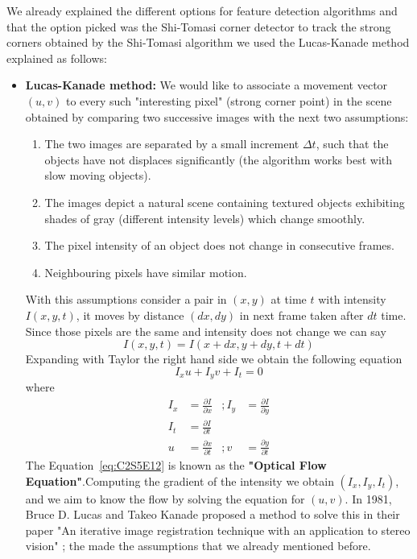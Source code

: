 We already explained the different options for feature detection algorithms and that the option picked was the Shi-Tomasi corner detector to track the strong corners obtained by the Shi-Tomasi algorithm we used the Lucas-Kanade method explained as follows:
\begin{itemize}
\item \textbf{Lucas-Kanade method:} We would like to associate a movement vector $(u,v)$ to every such "interesting pixel" (strong corner point) in the scene obtained by comparing two successive images with the next two assumptions:
\begin{enumerate}
\item The two images are separated by a small increment $\Delta t$, such that the objects have not displaces significantly (the algorithm works best with slow moving objects). 
\item The images depict a natural scene containing textured objects exhibiting shades of gray (different intensity levels) which change smoothly.
\item The pixel intensity of an object does not change in consecutive frames.
\item Neighbouring pixels have similar motion.
\end{enumerate}
With this assumptions consider a pair in $(x,y)$ at time $t$ with intensity $I(x,y,t)$, it moves by distance $(dx,dy)$ in next frame taken after $dt$ time. Since those pixels are the same and intensity does not change we can say 
$$
I(x,y,t)=I(x+dx,y+dy,t+dt)
$$
Expanding with Taylor the right hand side we obtain the following equation
\begin{equation}
\label{eq:C2S5E12}
I_xu+I_yv+I_t=0
\end{equation}
where 
$$
\begin{aligned}
I_x &= \frac{\partial I}{\partial x}&;
I_y &= \frac{\partial I}{\partial y}\\
I_t &= \frac{\partial I}{\partial t}\\
u &= \frac{\partial x}{\partial t}&;
v &= \frac{\partial y}{\partial t}
\end{aligned}
$$
The Equation~\ref{eq:C2S5E12} is known as the \textbf{"Optical Flow Equation"}.Computing the gradient of the intensity we obtain $(I_x,I_y,I_t)$, and we aim to know the flow by solving the equation for $(u,v)$. In 1981, Bruce D. Lucas and Takeo Kanade proposed a method to solve this in their paper "An iterative image registration technique with an application to stereo vision" \cite{LucasKanade}; the made the assumptions that we already mentioned before. 


\end{itemize}
